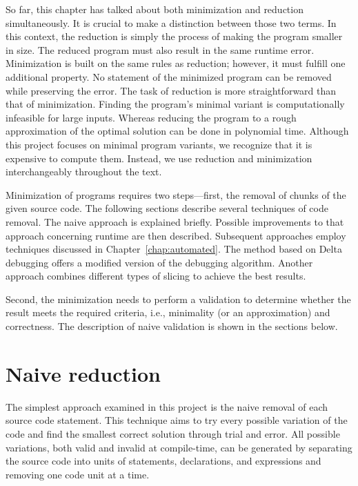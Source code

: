 So far, this chapter has talked about both minimization and reduction 
simultaneously. 
It is crucial to make a distinction between those two terms. 
In this context, the reduction is simply the process of making the program 
smaller in size. 
The reduced program must also result in the same runtime error. 
Minimization is built on the same rules as reduction; however, it must 
fulfill one additional property. 
No statement of the minimized program can be removed while preserving 
the error. 
The task of reduction is more straightforward than that of minimization. 
Finding the program's minimal variant is computationally infeasible for 
large inputs. 
Whereas reducing the program to a rough approximation of the optimal 
solution can be done in polynomial time. 
Although this project focuses on minimal program variants, we recognize that 
it is expensive to compute them. 
Instead, we use reduction and minimization interchangeably throughout 
the text.

Minimization of programs requires two steps—first, the removal of chunks 
of the given source code. 
The following sections describe several techniques of code removal. 
The naive approach is explained briefly. 
Possible improvements to that approach concerning runtime are then described. 
Subsequent approaches employ techniques discussed in 
Chapter~\ref{chap:automated}. 
The method based on Delta debugging offers a modified version of 
the debugging algorithm. 
Another approach combines different types of slicing to achieve the best 
results.

Second, the minimization needs to perform a validation to determine whether 
the result meets the required criteria, i.e., minimality (or an approximation) 
and correctness.
The description of naive validation is shown in the sections below.

\section{Naive reduction}\label{chap:naive}

The simplest approach examined in this project is the naive removal of each 
source code statement.
This technique aims to try every possible variation of the code and find 
the smallest correct solution through trial and error.
All possible variations, both valid and invalid at compile-time, can be 
generated by separating the source code into units of statements, 
declarations, and expressions and removing one code unit at a time.

